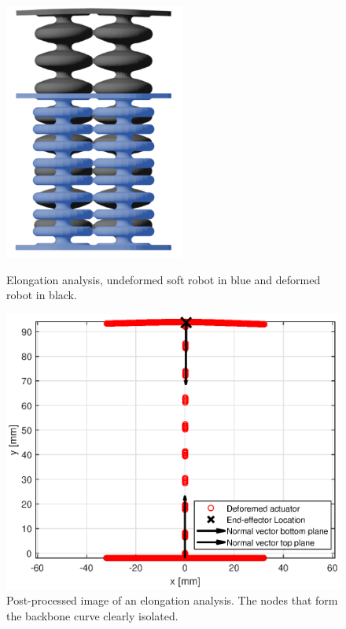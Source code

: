 \begin{figure}[H]
    \centering
\begin{minipage}{0.5\textwidth}
        \centering
        \includegraphics[width=0.53\textwidth]{Figures/Chapter3/elongation.png} 
        \caption{Elongation analysis, undeformed soft robot in blue and deformed robot in black. }
        \label{fig3:schematicelong}
    \end{minipage}\hfill
    \begin{minipage}{0.5\textwidth}
        \centering
        \includegraphics[width=\textwidth]{Figures/Chapter3/elongation60good.eps} 
        \caption{Post-processed image of an elongation analysis. The nodes that form the backbone curve clearly isolated.}
        \label{fig3:nodalelong}
    \end{minipage}
\end{figure}    

